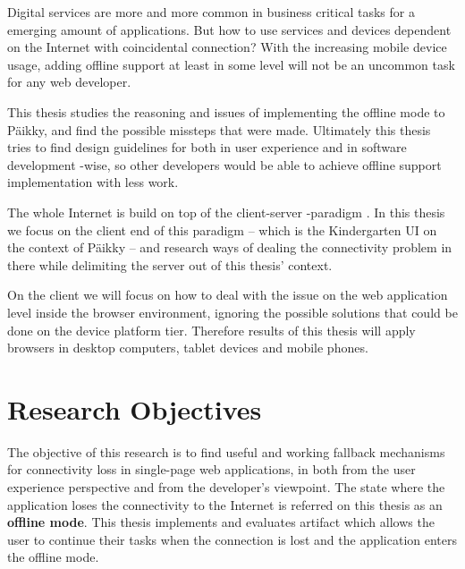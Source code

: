 Digital services are more and more common in business critical tasks for a emerging amount of applications. But how to use services and devices dependent on the Internet with coincidental connection? With the increasing mobile device usage, adding offline support at least in some level will not be an uncommon task for any web developer.

This thesis studies the reasoning and issues of implementing the offline mode to Päikky, and find the possible missteps that were made. Ultimately this thesis tries to find design guidelines for both in user experience and in software development -wise, so other developers would be able to achieve offline support implementation with less work.

The whole Internet is build on top of the client-server -paradigm \cite{berson_client-server_1992}. In this thesis we focus on the client end of this paradigm – which is the Kindergarten UI on the context of Päikky – and research ways of dealing the connectivity problem in there while delimiting the server out of this thesis' context. 

On the client we will focus on how to deal with the issue on the web application level inside the browser environment, ignoring the possible solutions that could be done on the device platform tier. Therefore results of this thesis will apply browsers in desktop computers, tablet devices and mobile phones.






\section{Research Objectives}
The objective of this research is to find useful and working fallback mechanisms for connectivity loss in single-page web applications, in both from the user experience perspective and from the developer's viewpoint. The state where the application loses the connectivity to the Internet is referred on this thesis as an \textbf{offline mode}. This thesis implements and evaluates artifact which allows the user to continue their tasks when the connection is lost and the application enters the offline mode.

